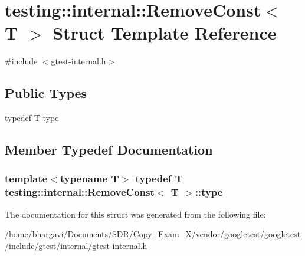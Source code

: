 \hypertarget{structtesting_1_1internal_1_1_remove_const}{}\section{testing\+:\+:internal\+:\+:Remove\+Const$<$ T $>$ Struct Template Reference}
\label{structtesting_1_1internal_1_1_remove_const}


{\ttfamily \#include $<$gtest-\/internal.\+h$>$}

\subsection*{Public Types}
\begin{DoxyCompactItemize}
\item 
typedef T \hyperlink{structtesting_1_1internal_1_1_remove_const_a1be32027ea4edcc0d15abd59aba4a97f}{type}
\end{DoxyCompactItemize}


\subsection{Member Typedef Documentation}
\subsubsection[{\texorpdfstring{type}{type}}]{\setlength{\rightskip}{0pt plus 5cm}template$<$typename T$>$ typedef T {\bf testing\+::internal\+::\+Remove\+Const}$<$ T $>$\+::{\bf type}}\hypertarget{structtesting_1_1internal_1_1_remove_const_a1be32027ea4edcc0d15abd59aba4a97f}{}\label{structtesting_1_1internal_1_1_remove_const_a1be32027ea4edcc0d15abd59aba4a97f}


The documentation for this struct was generated from the following file\+:\begin{DoxyCompactItemize}
\item 
/home/bhargavi/\+Documents/\+S\+D\+R/\+Copy\+\_\+\+Exam\+\_\+X/vendor/googletest/googletest/include/gtest/internal/\hyperlink{gtest-internal_8h}{gtest-\/internal.\+h}\end{DoxyCompactItemize}
